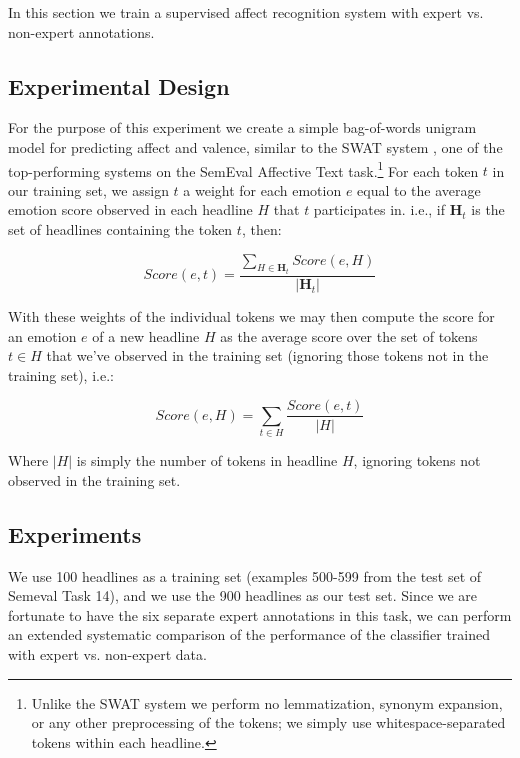\documentclass[11pt]{article}
\begin{document}
In this section we train a supervised affect recognition system with expert vs. non-expert annotations.

\subsection{ Experimental Design }

For the purpose of this experiment we create a simple bag-of-words unigram model for predicting affect and valence, similar to the SWAT system \cite{SWAT}, one of the top-performing systems on the SemEval Affective Text task.\footnote{ Unlike the SWAT system we perform no lemmatization, synonym expansion, or any other preprocessing of the tokens;  we simply use whitespace-separated tokens within each headline.} For each token $t$ in our training set, we assign $t$ a weight for each emotion $e$ equal to the average emotion score observed in each headline $H$ that $t$ participates in. i.e., if $\mathbf{H}_t$ is the set of headlines containing the token $t$, then:

\begin{equation*}
Score(e,t) = \frac{ \sum_{ H \in \mathbf{H}_t } Score(e,H) }{ | \mathbf{H}_t | }
\end{equation*}

With these weights of the individual tokens we may then compute the score for an emotion $e$ of a new headline $H$ as the average score over the set of tokens $t \in H$ that we've observed in the training set (ignoring those tokens not in the training set), i.e.:

\begin{equation*}
Score(e,H) = \sum_{ t \in H} \frac{ Score(e,t) }{ | H |}
\end{equation*}

Where $|H|$ is simply the number of tokens in headline $H$, ignoring tokens not observed in the training set.

\subsection{ Experiments }

We use 100 headlines as a training set (examples 500-599 from the test set of Semeval Task 14),  and we use the 900 headlines as our test set. Since we are fortunate to have the six separate expert annotations in this task, we can perform an extended systematic comparison of the performance of the classifier trained with expert vs. non-expert data.
\end{document}
